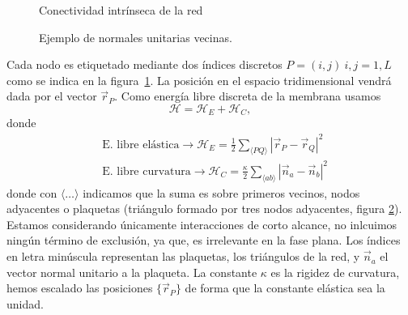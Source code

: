 \begin{figure}[h]
\centering
\resizebox{275bp}{!}{}
\caption{Conectividad intrínseca de la red}\label{red_rombo}
\end{figure}
\begin{figure}[h]
\centering
\resizebox{\columnwidth}{!}{}
\caption{Ejemplo de normales unitarias vecinas.}\label{normales-adyacentes-fig}
\end{figure}
Cada nodo es etiquetado mediante dos índices discretos $P=(i,j)\ i,j=1,L$
como se indica en la figura~\ref{red_rombo}. La posición en el espacio
tridimensional vendrá dada por el vector $\vec{r}_P$. Como energía libre
discreta de la membrana \cite{Bowick_flat_phase} usamos
\begin{equation*}
\mathcal{H}=\mathcal{H}_E+\mathcal{H}_C,
\end{equation*}
donde
\begin{align}
&\text{E. libre  elástica}\rightarrow \mathcal{H}_E=\frac{1}{2}\sum_{\langle PQ
  \rangle}|\vec{r}_P-\vec{r}_Q|^2\label{Hd_elastico}\\
&\text{E. libre curvatura}\rightarrow \mathcal{H}_C=\frac{\kappa}{2}\sum_{\langle ab \rangle}|\vec{n}_a-\vec{n}_b|^2\label{Hd_curvatura} 
\end{align}
donde con $\langle\dots\rangle$ indicamos que la suma es sobre primeros vecinos,
nodos adyacentes o plaquetas (triángulo formado por tres nodos adyacentes,
figura \ref{normales-adyacentes-fig}). Estamos considerando únicamente interacciones de corto
alcance,  no inlcuimos ningún término de exclusión, ya que, es irrelevante en
la fase plana. Los  índices en letra minúscula representan las plaquetas, 
los triángulos de la red, y $\vec{n}_{a}$ el vector normal unitario a la plaqueta. La
constante $\kappa$ es la rigidez de curvatura, hemos escalado las posiciones $\{\vec{r}_P\}$ de
forma que la constante elástica sea la unidad.


